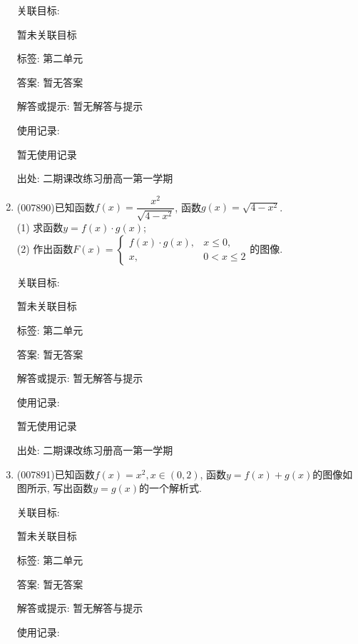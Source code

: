 \documentclass[10pt,a4paper]{article}
\begin{document}
\begin{enumerate}[1.]
关联目标:

暂未关联目标



标签: 第二单元

答案: 暂无答案

解答或提示: 暂无解答与提示

使用记录:

暂无使用记录


出处: 二期课改练习册高一第一学期
\item { (007890)}已知函数$f(x)=\dfrac{x^2}{\sqrt {4-{x^2}}}$, 函数$g(x)=\sqrt {4-x^2}$.\\
(1) 求函数$y=f(x)\cdot g(x)$;\\
(2) 作出函数$F(x)=\begin{cases} f(x)\cdot g(x), & x\le 0, \\ x, & 0<x\le 2 \end{cases}$的图像.


关联目标:

暂未关联目标



标签: 第二单元

答案: 暂无答案

解答或提示: 暂无解答与提示

使用记录:

暂无使用记录


出处: 二期课改练习册高一第一学期
\item { (007891)}已知函数$f(x)=x^2,x\in (0,2)$, 函数$y=f(x)+g(x)$的图像如图所示, 写出函数$y=g(x)$的一个解析式.
\begin{center}
\end{center}


关联目标:

暂未关联目标



标签: 第二单元

答案: 暂无答案

解答或提示: 暂无解答与提示

使用记录:


\end{enumerate}
\end{document}
